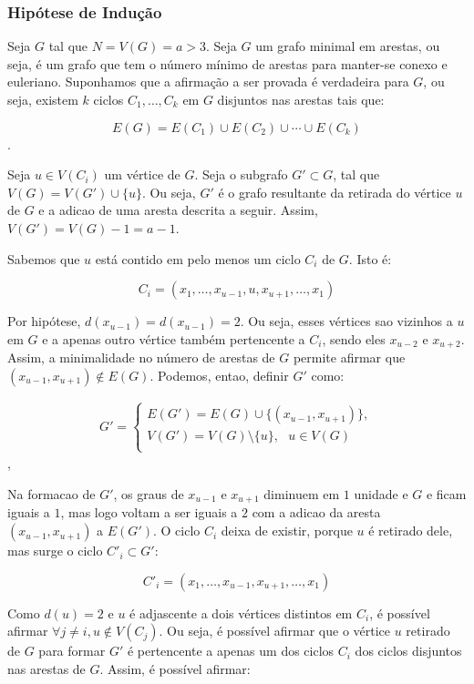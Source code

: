 \documentclass{article}
\begin{document}
\subsubsection*{Hipótese de Indução}
Seja $G$ tal que $N = V(G) =  a >  3$. Seja $G$ um grafo minimal em arestas, ou seja, é um grafo que tem o número mínimo de arestas para manter-se conexo e euleriano.  Suponhamos que a afirmação a ser provada é verdadeira para $G$, ou seja, existem $k$ ciclos $C_1, \ldots, C_k$ em $G$ disjuntos nas arestas tais que:

$$E(G) = E(C_1) \cup E(C_2) \cup \cdots \cup E(C_k)$$.


Seja $u \in V(C_i)$ um vértice de $G$. Seja o subgrafo $G' \subset G$, tal que $V(G) = V(G') \cup \{u\}$. Ou seja, $G'$ é o grafo resultante da retirada do vértice $u$ de $G$ e a adicao de uma aresta descrita a seguir. Assim, $V(G') = V(G) - 1 = a - 1$.

Sabemos que $u$ está contido em pelo menos um ciclo $C_i$ de $G$. Isto é:

$$C_i = (x_1, \ldots, x_{u-1}, u, x_{u+1}, \ldots, x_1)$$


Por hipótese, $d(x_{u-1}) = d(x_{u-1}) = 2$. Ou seja, esses vértices sao vizinhos a $u$ em $G$ e a apenas outro vértice também pertencente a $C_i$, sendo eles  $x_{u-2}$ e  $x_{u+2}$. Assim, a minimalidade no número de arestas de $G$ permite afirmar que  $(x_{u-1}, x_{u+1}) \notin E(G)$. Podemos, entao, definir $G'$ como:

\begin{align}
	G' = 
	\begin{cases} 
		E(G') = E(G) \cup \{(x_{u-1}, x_{u+1})\} , \\
		V(G') = V(G) \setminus \{u\}, \text{   } u \in V(G)  \\
	\end{cases}
\end{align},

Na formacao de $G'$, os graus de $x_{u-1}$ e $x_{u+1}$ diminuem em $1$ unidade e $G$ e ficam iguais a $1$, mas logo voltam a ser iguais a $2$ com a adicao da aresta $(x_{u-1}, x_{u+1})$  a $E(G')$. O ciclo $C_i$ deixa de existir, porque $u$ é retirado dele, mas surge o ciclo $C'_i \subset G'$:

$$C'_i = (x_1, \ldots, x_{u-1}, x_{u+1}, \ldots, x_1)$$

Como $d(u) = 2$ e $u$ é adjascente a dois vértices distintos em $C_i$, é possível afirmar $\forall j \neq i, u \notin V(C_j) $. Ou seja, é possível afirmar que o vértice $u$ retirado de $G$ para formar $G'$ é pertencente a apenas um dos ciclos $C_i$ dos ciclos disjuntos nas arestas de $G$.
Assim, é possível afirmar:
\end{document}
